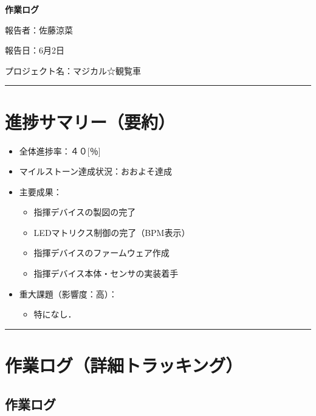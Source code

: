 \documentclass[uplatex,dvipdfmx,a4paper,11pt]{jsarticle}
\newcommand{\sectionrule}{\par\medskip\noindent\rule{\linewidth}{0.6pt}\par\medskip}
\begin{document}
{\LARGE\bfseries 作業ログ}\par\bigskip

報告者：佐藤涼菜

報告日：6月2日

プロジェクト名：マジカル☆観覧車

\sectionrule


\section{進捗サマリー（要約）}

\begin{itemize}
  \item 全体進捗率：４０[％]
  \item マイルストーン達成状況：おおよそ達成
  \item 主要成果：
    \begin{itemize}
      \item {指揮デバイスの製図の完了}
      \item {LEDマトリクス制御の完了（BPM表示）}
      \item {指揮デバイスのファームウェア作成}
      \item {指揮デバイス本体・センサの実装着手}
    \end{itemize}
  \item 重大課題（影響度：高）：
    \begin{itemize}
      \item {特になし．}
    \end{itemize}
\end{itemize}

\sectionrule


\section{作業ログ（詳細トラッキング）}

\subsection{作業ログ}

\renewcommand{\arraystretch}{1.2}

\small
\end{document}
